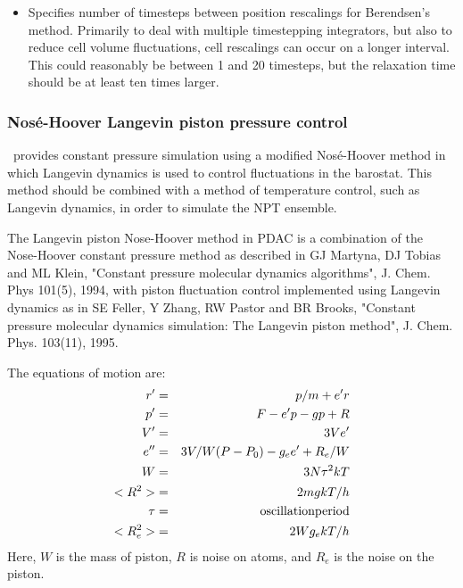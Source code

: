\begin{itemize}
\item
{}
{Specifies number of timesteps between position rescalings for Berendsen's method.
Primarily to deal with multiple timestepping integrators, but also to reduce
cell volume fluctuations, cell rescalings can occur on a longer interval.
This could reasonably be between 1 and 20 timesteps, but the relaxation time
should be at least ten times larger.
}

\end{itemize}

\subsubsection{Nos\'{e}-Hoover Langevin piston pressure control}

\PDAC\ provides constant pressure simulation using a modified Nos\'{e}-Hoover method in which Langevin dynamics is used to control fluctuations in the barostat.
This method should be combined with a method of temperature control, such as Langevin dynamics, in order to simulate the NPT ensemble.

The Langevin piston Nose-Hoover method in PDAC is a combination of the
Nose-Hoover constant pressure method as described in 
GJ Martyna, DJ Tobias and ML Klein, "Constant pressure molecular dynamics
algorithms", J. Chem. Phys 101(5), 1994,
with piston fluctuation control implemented using Langevin dynamics as in
SE Feller, Y Zhang, RW Pastor and BR Brooks, "Constant pressure molecular
dynamics simulation: The Langevin piston method", J. Chem. Phys. 103(11),
1995.

The equations of motion are:
\begin{eqnarray*}
       r' &=& p/m + e' r  \\
       p' &=& F - e' p - g p + R \\
       V' &=& 3 V e' \\
       e'' &=& 3V/W (P - P_0) - g_e e' + R_e/W  \\
       W &=&  3 N \tau^2 k T  \\
       <R^2> &=& 2 m g k T / h \\
       \tau &=& {\rm oscillation period} \\
       <R_e^2> &=& 2 W g_e k T / h
\end{eqnarray*}
Here, $W$ is the mass of piston, $R$ is noise on atoms, and $R_e$ is
the noise on the piston.

